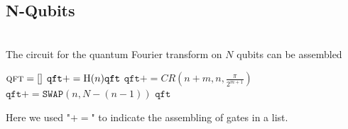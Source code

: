 \subsection*{N-Qubits}
\begin{algo*}\phantom{...}\\
The circuit for the quantum Fourier transform on $N$ qubits can be assembled
\begin{algorithmic}
\STATE $\textsc{qft} = \left[\right] $
\STATE $ \texttt{qft} += \operatorname{H}(n) \texttt{qft} $
\STATE $ \texttt{qft} += CR\left(n+m,n,\frac{\pi}{2^{m+1}}\right)$
\ENDFOR
\ENDFOR
{}
\STATE $\texttt{qft} += \texttt{SWAP}(n,N-(n-1))$
\ENDFOR
\RETURN $\texttt{qft}$
\end{algorithmic}
Here we used "$+=$" to indicate the assembling of gates in a list. 
\end{algo*}
